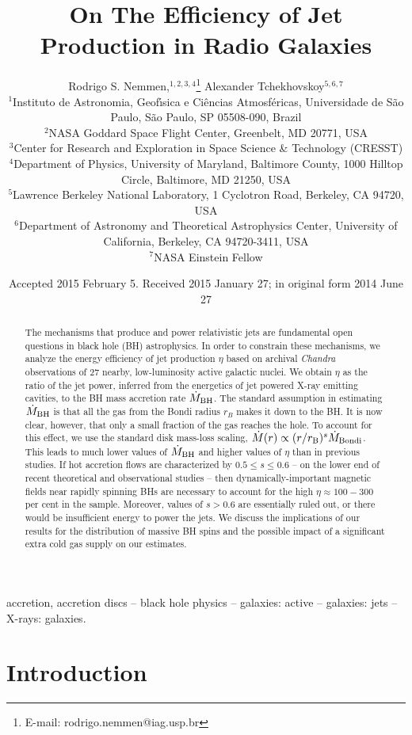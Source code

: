 \documentclass[useAMS,usenatbib]{mn2e}
\title[On the Efficiency of Jet Production in AGNs]{On The Efficiency of Jet Production in Radio Galaxies}
\author[Nemmen]{Rodrigo S. Nemmen,$^{1,2,3,4}$\thanks{E-mail: rodrigo.nemmen@iag.usp.br} Alexander Tchekhovskoy$^{5,6,7}$ \\
$^{1}$Instituto de Astronomia, Geof\'{\i}sica e Ci\^encias Atmosf\'ericas, Universidade de S\~ao Paulo, S\~ao Paulo, SP 05508-090, Brazil \\
$^{2}$NASA Goddard Space Flight Center, Greenbelt, MD 20771, USA \\
$^{3}$Center for Research and Exploration in Space Science \& Technology (CRESST) \\
$^{4}$Department of Physics, University of Maryland, Baltimore County, 1000 Hilltop Circle, Baltimore, MD 21250, USA \\
$^5$Lawrence Berkeley National Laboratory, 1 Cyclotron Road, Berkeley, CA 94720, USA \\$^6$Department of Astronomy and Theoretical Astrophysics Center, University of California, Berkeley, CA 94720-3411, USA \\
$^7$NASA Einstein Fellow \\
}
\begin{document}
\date{Accepted 2015 February 5. Received 2015 January 27; in original form 2014 June 27}

\pagerange{\pageref{firstpage}--\pageref{lastpage}} 

\maketitle

\label{firstpage}

\begin{abstract}
The mechanisms that produce and power relativistic jets are fundamental open questions in black hole (BH) astrophysics. In order to constrain these mechanisms, we analyze the energy efficiency of jet production $\eta$ based on archival \emph{Chandra} observations of 27 nearby, low-luminosity active galactic nuclei. We obtain $\eta$ as the ratio of the jet power, inferred from the energetics of jet powered X-ray emitting cavities, to the BH mass accretion rate $\dot{M}_{\rm BH}$. The standard assumption in estimating $\dot{M}_{\rm BH}$ is that all the gas from the Bondi radius $r_B$ makes it down to the BH. It is now clear, however, that only a small fraction of the gas reaches the hole. To account for this effect, 
we use the standard disk mass-loss scaling, $\dot{M}(r) \propto (r/r_{\rm B})^s \dot M_{\rm Bondi}$. 
This leads to much lower values of $\dot M_{\rm BH}$ and higher values of $\eta$ than in previous studies. If hot accretion flows are characterized by $0.5 \leq s \leq 0.6$ -- on the lower end of recent theoretical and observational studies -- then dynamically-important magnetic fields near rapidly spinning BHs are necessary to account for the high $\eta \approx 100-300$ per cent in the sample. Moreover, values of $s>0.6$ are essentially ruled out, or there would be insufficient energy to power the jets. 
We discuss the implications of our results for the distribution of massive BH spins and the possible impact of a significant extra cold gas supply on our estimates.
\end{abstract}


\begin{keywords}
accretion, accretion discs -- black hole physics -- galaxies: active -- galaxies: jets -- X-rays: galaxies.
\end{keywords}





\section{Introduction}
\end{document}
